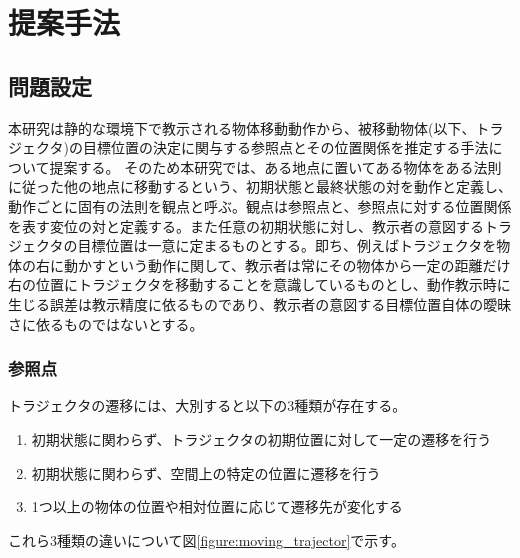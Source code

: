 ﻿%



\chapter{提案手法}

\section{問題設定}

本研究は静的な環境下で教示される物体移動動作から、被移動物体(以下、トラジェクタ)の目標位置の決定に関与する参照点とその位置関係を推定する手法について提案する。
そのため本研究では、ある地点に置いてある物体をある法則に従った他の地点に移動するという、初期状態と最終状態の対を動作と定義し、動作ごとに固有の法則を観点と呼ぶ。観点は参照点と、参照点に対する位置関係を表す変位の対と定義する。また任意の初期状態に対し、教示者の意図するトラジェクタの目標位置は一意に定まるものとする。即ち、例えばトラジェクタを物体の右に動かすという動作に関して、教示者は常にその物体から一定の距離だけ右の位置にトラジェクタを移動することを意識しているものとし、動作教示時に生じる誤差は教示精度に依るものであり、教示者の意図する目標位置自体の曖昧さに依るものではないとする。

\subsection{参照点}

トラジェクタの遷移には、大別すると以下の3種類が存在する。

	\begin{enumerate}
		\item 初期状態に関わらず、トラジェクタの初期位置に対して一定の遷移を行う
		\item 初期状態に関わらず、空間上の特定の位置に遷移を行う
		\item 1つ以上の物体の位置や相対位置に応じて遷移先が変化する
	\end{enumerate}
これら3種類の違いについて図\ref{figure:moving_trajector}で示す。


